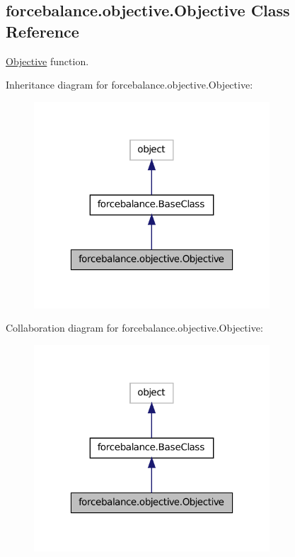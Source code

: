 \hypertarget{classforcebalance_1_1objective_1_1Objective}{\subsection{forcebalance.\-objective.\-Objective Class Reference}
\label{classforcebalance_1_1objective_1_1Objective}
}


\hyperlink{classforcebalance_1_1objective_1_1Objective}{Objective} function.  




Inheritance diagram for forcebalance.\-objective.\-Objective\-:
\nopagebreak
\begin{figure}[H]
\begin{center}
\leavevmode
\includegraphics[width=250pt]{classforcebalance_1_1objective_1_1Objective__inherit__graph}
\end{center}
\end{figure}


Collaboration diagram for forcebalance.\-objective.\-Objective\-:
\nopagebreak
\begin{figure}[H]
\begin{center}
\leavevmode
\includegraphics[width=250pt]{classforcebalance_1_1objective_1_1Objective__coll__graph}
\end{center}
\end{figure}
